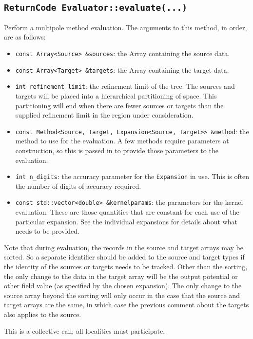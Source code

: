 \subsection{{\tt ReturnCode Evaluator::evaluate(...)}}

Perform a multipole method evaluation. The arguments to this method, in order,
are as follows:

\begin{itemize}
\item {\tt const Array<Source> \&sources}: the Array containing the source data.
\item {\tt const Array<Target> \&targets}: the Array containing the target data.
\item {\tt int refinement\_limit}: the refinement limit of the tree. The sources
  and  targets will be placed into a hierarchical partitioning of space. This
 partitioning will end when there are fewer sources or targets than the supplied
 refinement limit in the region under consideration.
\item {\tt const Method<Source, Target, Expansion<Source, Target>> \&method}:
  the  method to use for the evaluation. A few methods require parameters at
 construction, so this is passed in to provide those parameters to the
 evaluation.
\item {\tt int n\_digits}: the accuracy parameter for the {\tt Expansion} in
  use. This is  often the number of digits of accuracy required.
\item {\tt const std::vector<double> \&kernelparams}: the parameters for the
  kernel evaluation. These are those quantities that are constant for each use
  of the particular expansion. See
  the individual expansions for details about what needs to be provided.
\end{itemize}

Note that during evaluation, the records in the source and target arrays may be
sorted. So a separate identifier should be added to the source and target types
if the identity of the sources or targets needs to be tracked. Other than the
sorting, the only change to the data in the target array will be the output
potential or other field value (as specified by the chosen expansion). The
only change to the source array beyond the sorting will only occur in the case
that the source and target arrays are the same, in which case the previous
comment about the targets also applies to the source.

This is a collective call; all localities must participate.

